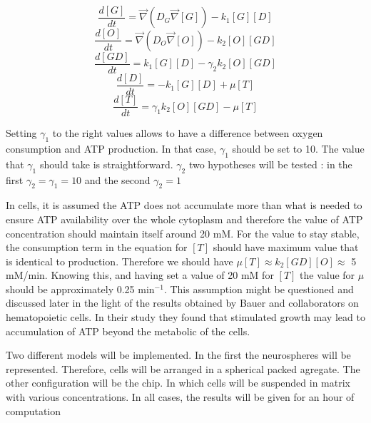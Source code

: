 \documentclass[11pt,a4paper]{article}
\begin{document}
\[ \frac{d [G]}{d t} = \overrightarrow{\nabla} (D_G \overrightarrow{\nabla} [G]) - k_1 [G][D]  \]
\[ \frac{d [O]}{d t} = \overrightarrow{\nabla} (D_O \overrightarrow{\nabla} [O]) -  k_2 [O][GD]  \]
\[ \frac{d [GD]}{d t} =  k_1 [G][D] - \gamma_2 k_2 [O][GD] \]
\[ \frac{d [D]}{d t} =  -k_1 [G][D] + \mu [T]  \]
\[ \frac{d [T]}{d t} = \gamma_1 k_2 [O][GD] - \mu [T]  \] 

Setting $\gamma_1$ to the right values allows to have a difference between oxygen consumption and ATP production. In that case, $\gamma_1$ should be set to 10. The value that $\gamma_1$ should take is straightforward. $\gamma_2$ two hypotheses will be tested : in the first $\gamma_2 = \gamma_1 = 10 $ and the second $\gamma_2 = 1$


In cells, it is assumed the ATP does not accumulate more than what is needed to ensure ATP availability over the whole cytoplasm and therefore the value of ATP concentration should maintain itself around 20 mM. For the value to stay stable, the consumption term in the equation for $[T]$  should have maximum value that is identical to production. Therefore we should have $\mu [T] \approx k_{2}[GD][O] \approx $ 5 mM/min. Knowing this, and having set a value of 20 mM for $[T]$ the value for $\mu$ should be approximately 0.25  min$^{-1}$. This assumption might be questioned and discussed later in the light of the results obtained by Bauer and collaborators on hematopoietic cells. In their study they found that stimulated growth may lead to accumulation of ATP beyond the metabolic of the cells.\cite{Bauer2004}

Two different models will be implemented. In the first the neurospheres will be represented. Therefore, cells will be arranged in a spherical packed agregate. The other configuration will be the chip. In which cells will be suspended in  matrix with various concentrations. In all cases, the results will be given for an hour of computation
\end{document}
